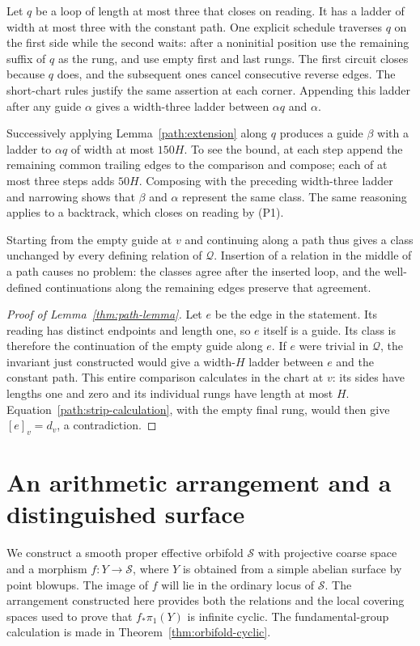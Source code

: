 \documentclass[11pt,reqno]{amsart}
\numberwithin{equation}{section}
\theoremstyle{definition}
\theoremstyle{remark}
\begin{document}
Let $q$ be a loop of length at most three that closes on reading.
It has a ladder of width at most three with the constant path.  One
explicit schedule traverses $q$ on the first side while the second
waits: after a noninitial position use the remaining suffix of $q$ as
the rung, and use empty first and last rungs.  The first circuit closes
because $q$ does, and the subsequent ones cancel consecutive reverse
edges.  The short-chart rules justify the same assertion at each corner.
Appending this ladder after any guide $\alpha$ gives a width-three
ladder between $\alpha q$ and $\alpha$.

Successively applying Lemma~\ref{path:extension} along $q$ produces a
guide $\beta$ with a ladder to $\alpha q$ of width at most $150H$.
To see the bound, at each step append the remaining common trailing
edges to the comparison and compose; each of at most three steps adds
$50H$.  Composing with the preceding width-three ladder and narrowing
shows that $\beta$ and $\alpha$ represent the same class.  The same
reasoning applies to a backtrack, which closes on reading by (P1).

Starting from the empty guide at $v$ and continuing along a path thus
gives a class unchanged by every defining relation of $\mathcal Q$.
Insertion of a relation in the middle of a path causes no problem:
the classes agree after the inserted loop, and the well-defined
continuations along the remaining edges preserve that agreement.

\begin{proof}[Proof of Lemma~\ref{thm:path-lemma}]
Let $e$ be the edge in the statement.  Its reading has distinct
endpoints and length one, so $e$ itself is a guide.  Its class is
therefore the continuation of the empty guide along $e$.  If $e$ were
trivial in $\mathcal Q$, the invariant just constructed would give a
width-$H$ ladder between $e$ and the constant path.  This entire
comparison calculates in the chart at $v$: its sides have lengths one
and zero and its individual rungs have length at most $H$.
Equation~\eqref{path:strip-calculation}, with the empty final rung,
would then give $[e]_v=d_v$, a contradiction.
\end{proof}

\section{An arithmetic arrangement and a distinguished surface}\label{sec:geometry}

We construct a smooth proper effective orbifold $\mathcal S$ with projective
coarse space and a morphism $f:Y\to\mathcal S$, where $Y$ is obtained from a
simple abelian surface by point blowups.  The image of $f$ will lie in
the ordinary locus of $\mathcal S$.  The arrangement constructed here provides
both the relations and the local covering spaces used to prove that
$f_*\pi_1(Y)$ is infinite cyclic.  The fundamental-group calculation is
made in Theorem~\ref{thm:orbifold-cyclic}.
\end{document}

